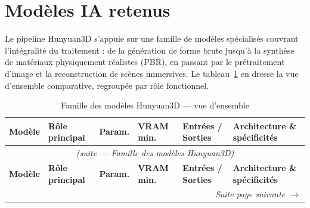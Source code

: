 \documentclass[12pt,a4paper,oneside]{report}
\renewcommand{\arraystretch}{1.35}
\newcommand{\theadrow}{\rowcolor{tekupblue!12}}
\begin{document}
\section{Modèles IA retenus}
\label{sec:modeles-ia}

Le pipeline Hunyuan3D s'appuie sur une famille de modèles spécialisés couvrant l'intégralité
du traitement : de la génération de forme brute jusqu'à la synthèse de matériaux physiquement
réalistes (PBR), en passant par le prétraitement d'image et la reconstruction de scènes
immersives. Le tableau~\ref{tab:modeles-hunyuan} en dresse la vue d'ensemble comparative,
regroupée par rôle fonctionnel.

{\renewcommand{\arraystretch}{1.2}\footnotesize
\begin{longtable}{@{}p{3.5cm}p{1.6cm}p{1.0cm}p{1.0cm}p{2.8cm}p{3.5cm}@{}}
\caption{Famille des modèles Hunyuan3D — vue d'ensemble}
\label{tab:modeles-hunyuan}\\
\toprule
\theadrow
\textbf{Modèle} & \textbf{Rôle principal} & \textbf{Param.} &
\textbf{VRAM min.} & \textbf{Entrées / Sorties} &
\textbf{Architecture \& spécificités} \\
\midrule
\endfirsthead
\multicolumn{6}{c}{\itshape (suite — Famille des modèles Hunyuan3D)}\\[2pt]
\toprule
\theadrow
\textbf{Modèle} & \textbf{Rôle principal} & \textbf{Param.} &
\textbf{VRAM min.} & \textbf{Entrées / Sorties} &
\textbf{Architecture \& spécificités} \\
\midrule
\endhead
\multicolumn{6}{r}{\itshape Suite page suivante $\rightarrow$}
\endfoot
\bottomrule
\endlastfoot


\end{longtable}}
\end{document}
